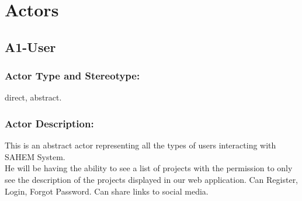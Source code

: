 \documentclass[11pt, openany]{report}
\begin{document}
\section{Actors}


\subsection{A1-User}
\label{A1}
\subsubsection{Actor Type and Stereotype:}
direct, abstract.
\subsubsection{Actor Description:}
This is an abstract actor representing all the types of users interacting with SAHEM System.
\\He will be having the ability to see a list of projects with the permission to only see the description of the projects displayed in our web application.
Can Register, Login, Forgot Password.
Can share links to social media.
\end{document}
